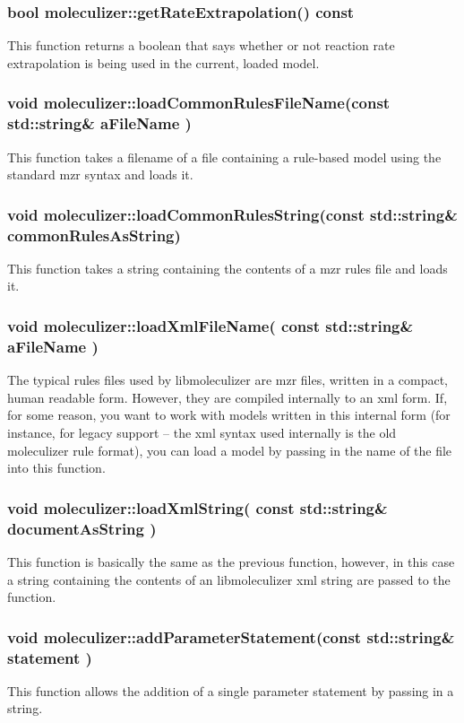 \subsubsection{bool moleculizer::getRateExtrapolation() const }
This function returns a boolean that says whether or not reaction rate
extrapolation is being used in the current, loaded model.  


\subsubsection{void moleculizer::loadCommonRulesFileName(const std::string\&
aFileName )}
This function takes a filename of a file containing a rule-based model
using the standard mzr syntax and loads it.  


\subsubsection{void moleculizer::loadCommonRulesString(const std::string\&
commonRulesAsString)}
This function takes a string containing the contents of a mzr rules
file and loads it.  

\subsubsection{void moleculizer::loadXmlFileName( const std::string\& aFileName )}
The typical rules files used by libmoleculizer are mzr files, written
in a compact, human readable form.  However, they are compiled
internally to an xml form.  If, for some reason, you want to work with
models written in this internal form (for instance, for legacy support
-- the xml syntax used internally is the old moleculizer rule format),
you can load a model by passing in the name of the file into this function.

\subsubsection{void moleculizer::loadXmlString( const std::string\& documentAsString
)}
This function is basically the same as the previous function, however,
in this case a string containing the contents of an libmoleculizer
xml string are passed to the function. 


\subsubsection{void moleculizer::addParameterStatement(const std::string\& statement )}
This function allows the addition of a single parameter statement by
passing in a string.  

